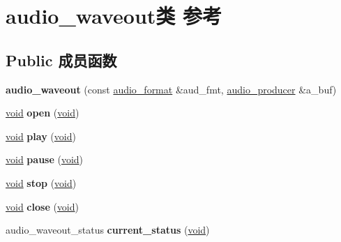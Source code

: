 \hypertarget{classaudio__waveout}{}\section{audio\+\_\+waveout类 参考}
\label{classaudio__waveout}
\subsection*{Public 成员函数}
\begin{DoxyCompactItemize}
\item 
\mbox{\label{classaudio__waveout_ae68969bafc632a314165c6a77f208bd1}} 
{\bfseries audio\+\_\+waveout} (const \hyperlink{classaudio__format}{audio\+\_\+format} \&aud\+\_\+fmt, \hyperlink{classaudio__producer}{audio\+\_\+producer} \&a\+\_\+buf)
\item 
\mbox{\label{classaudio__waveout_a3ccaa3ae16561e3c93986f4ad0982db5}} 
\hyperlink{interfacevoid}{void} {\bfseries open} (\hyperlink{interfacevoid}{void})
\item 
\mbox{\label{classaudio__waveout_a0fffeab2b57e1ed07c1898ccf39a902b}} 
\hyperlink{interfacevoid}{void} {\bfseries play} (\hyperlink{interfacevoid}{void})
\item 
\mbox{\label{classaudio__waveout_abe3164293b5eb4794b7f3e1fa305a8d7}} 
\hyperlink{interfacevoid}{void} {\bfseries pause} (\hyperlink{interfacevoid}{void})
\item 
\mbox{\label{classaudio__waveout_a24b2459180fb13e26e133389ce73b9fc}} 
\hyperlink{interfacevoid}{void} {\bfseries stop} (\hyperlink{interfacevoid}{void})
\item 
\mbox{\label{classaudio__waveout_a6d0d38ef7e1285c43a0f485f194a8556}} 
\hyperlink{interfacevoid}{void} {\bfseries close} (\hyperlink{interfacevoid}{void})
\item 
\mbox{\label{classaudio__waveout_a259696ee19bb40b5d801109b94880649}} 
audio\+\_\+waveout\+\_\+status {\bfseries current\+\_\+status} (\hyperlink{interfacevoid}{void})
\item 
\mbox{\label{classaudio__waveout_a0016e7b49982ee1540cc146a02847d15}} 

\end{DoxyCompactItemize}
